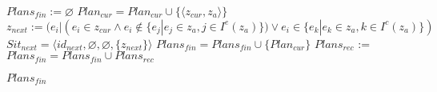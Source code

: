 	\Statex{}
	\State $Plans_{fin} := \varnothing$
		\State $Plan_{cur} = Plan_{cur}\cup\{\langle z_{cur}, z_a\rangle\}$
		\Statex{} 		
		\State $z_{next} := (e_i|(e_i\in z_{cur} \land e_i\not\in\{e_j|e_j\in z_a, j\in I^e(z_a)\}) \lor e_i\in\{e_k|e_k\in z_a, k\in I^c(z_a)\})$\label{alst:p_next_gen}
		\State $Sit_{next} = \langle id_{next}, \varnothing, \varnothing, \{z_{next}\} \rangle$
		\label{alst:suc_exit}
			\State $Plans_{fin} = Plans_{fin}\cup\{Plan_{cur}\}$
		\Else
			\State $Plans_{rec}$ := 
			\State $Plans_{fin} = Plans_{fin}\cup Plans_{rec}$
		\EndIf
	\EndFor
	
	\State\Return $Plans_{fin}$
\EndFunction